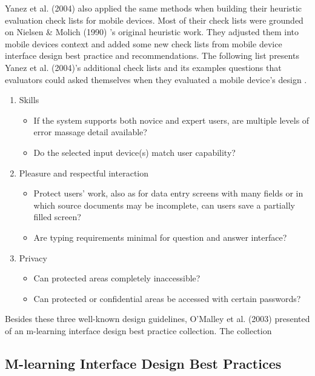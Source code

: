 Yanez et al. (2004) \cite{yanez2014heuristic} also applied the same methods when building their heuristic evaluation check lists for mobile devices. Most of their check lists  were grounded on Nielsen \& Molich (1990) \cite{nielsen199510}'s original heuristic work. They adjusted them into mobile devices context and added some new check lists from mobile device interface design best practice and recommendations. The following list presents Yanez et al. (2004)'s additional check lists and its examples questions that evaluators could asked themselves when they evaluated a mobile device's design \cite[pp. 10]{yanez2014heuristic}.
\begin{enumerate}
\item Skills 
\begin{itemize}
\item If the system supports both novice and expert users, are multiple levels of error massage detail available? 
\item Do the selected input device(s) match user capability?
\end{itemize}
\item Pleasure and respectful interaction 
\begin{itemize}
\item Protect users' work, also as for data entry screens with many fields or in which source documents may be incomplete, can users save a partially filled screen?
\item Are typing requirements minimal for question and answer interface?
\end{itemize}
\item Privacy
\begin{itemize}
\item Can protected areas completely inaccessible?
\item Can protected or confidential areas be accessed with certain passwords?
\end{itemize}
\end{enumerate} 

Besides these three well-known design guidelines, O'Malley et al. (2003) \cite{o2003guidelines} presented of an m-learning interface design best practice collection. The collection 

\subsection{M-learning Interface Design Best Practices} 

